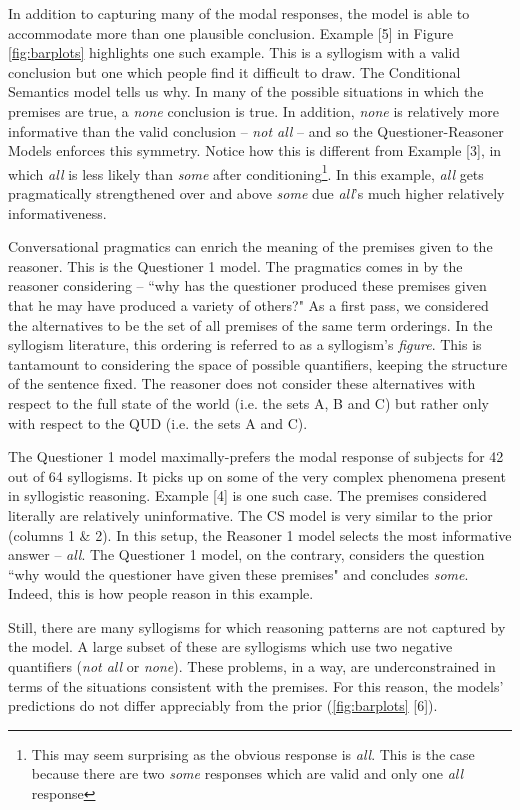 \documentclass[10pt,letterpaper]{article}
\begin{document}
In addition to capturing many of the modal responses, the model is able to accommodate more than one plausible conclusion. Example [5] in Figure \ref{fig:barplots} highlights one such example. This is a syllogism with a valid conclusion but one which people find it difficult to draw. The Conditional Semantics model tells us why. In many of the possible situations in which the premises are true, a \emph{none} conclusion is true. In addition, \emph{none} is relatively more informative than the valid conclusion -- \emph{not all} -- and so the Questioner-Reasoner Models enforces this symmetry. Notice how this is different from Example [3], in which \emph{all} is less likely than \emph{some} after conditioning\footnote{This may seem surprising as the obvious response is \emph{all}. This is the case because there are two \emph{some} responses which are valid and only one \emph{all} response}. In this example, \emph{all} gets pragmatically strengthened over and above \emph{some} due \emph{all}'s much higher relatively informativeness.  

Conversational pragmatics can enrich the meaning of the premises given to the reasoner. This is the Questioner 1 model. The pragmatics comes in by the reasoner considering -- ``why has the questioner produced these premises given that he may have produced a variety of others?" As a first pass, we considered the alternatives to be the set of all premises of the same term orderings. In the syllogism literature, this ordering is referred to as a syllogism's \emph{figure}. This is tantamount to considering the space of possible quantifiers, keeping the structure of the sentence fixed. The reasoner does not consider these alternatives with respect to the full state of the world (i.e. the sets A, B and C) but rather only with respect to the QUD (i.e. the sets A and C). 

The Questioner 1 model maximally-prefers the modal response of subjects for 42 out of 64 syllogisms. It picks up on some of the very complex phenomena present in syllogistic reasoning. Example [4] is one such case. The premises considered literally are relatively uninformative. The CS model is very similar to the prior (columns 1 \& 2). In this setup, the Reasoner 1 model selects the most informative answer -- \emph{all}. The Questioner 1 model, on the contrary, considers the question ``why would the questioner have given these premises" and concludes \emph{some}. Indeed, this is how people reason in this example. 

Still, there are many syllogisms for which reasoning patterns are not captured by the model. A large subset of these are syllogisms which use two negative quantifiers (\emph{not all} or \emph{none}). These problems, in a way, are underconstrained in terms of the situations consistent with the premises. For this reason, the models' predictions do not differ appreciably from the prior (\ref{fig:barplots} [6]).
\end{document}
